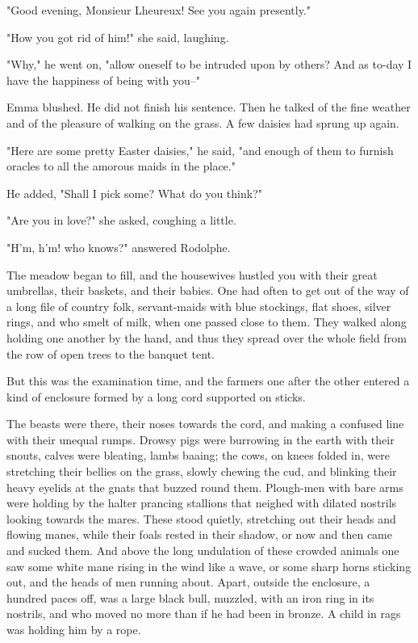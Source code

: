 \documentclass[11pt,twocolumn]{ltugboat}
\begin{document}
"Good evening, Monsieur Lheureux! See you again presently."

"How you got rid of him!" she said, laughing.

"Why," he went on, "allow oneself to be intruded upon by others? And as
to-day I have the happiness of being with you--"

Emma blushed. He did not finish his sentence. Then he talked of the fine
weather and of the pleasure of walking on the grass. A few daisies had
sprung up again.

"Here are some pretty Easter daisies," he said, "and enough of them to
furnish oracles to all the amorous maids in the place."

He added, "Shall I pick some? What do you think?"

"Are you in love?" she asked, coughing a little.

"H'm, h'm! who knows?" answered Rodolphe.

The meadow began to fill, and the housewives hustled you with their
great umbrellas, their baskets, and their babies. One had often to get
out of the way of a long file of country folk, servant-maids with blue
stockings, flat shoes, silver rings, and who smelt of milk, when one
passed close to them. They walked along holding one another by the hand,
and thus they spread over the whole field from the row of open trees to
the banquet tent.

But this was the examination time, and the farmers one after the other
entered a kind of enclosure formed by a long cord supported on sticks.

The beasts were there, their noses towards the cord, and making a
confused line with their unequal rumps. Drowsy pigs were burrowing in
the earth with their snouts, calves were bleating, lambs baaing; the
cows, on knees folded in, were stretching their bellies on the grass,
slowly chewing the cud, and blinking their heavy eyelids at the gnats
that buzzed round them. Plough-men with bare arms were holding by the
halter prancing stallions that neighed with dilated nostrils looking
towards the mares. These stood quietly, stretching out their heads and
flowing manes, while their foals rested in their shadow, or now and then
came and sucked them. And above the long undulation of these crowded
animals one saw some white mane rising in the wind like a wave, or some
sharp horns sticking out, and the heads of men running about. Apart,
outside the enclosure, a hundred paces off, was a large black bull,
muzzled, with an iron ring in its nostrils, and who moved no more than
if he had been in bronze. A child in rags was holding him by a rope.
\end{document}
